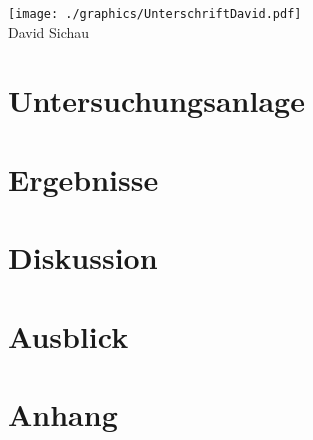 \documentclass[12pt,twoside]{scrbook}
\begin{document}
\texttt{[image: ./graphics/UnterschriftDavid.pdf]}\\
David Sichau




\mainmatter









\chapter{Untersuchungsanlage}

\chapter{Ergebnisse}

\chapter{Diskussion}

\chapter{Ausblick}



\appendix 



\backmatter	

\printbibliography[heading=bibintoc]

\chapter{Anhang}
\end{document}
